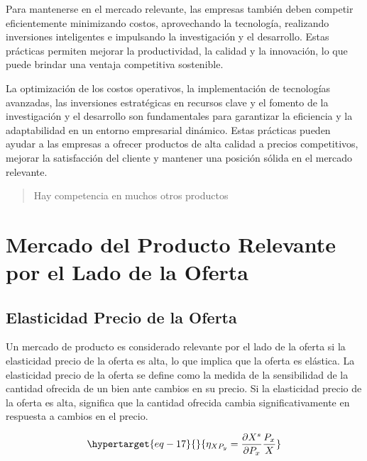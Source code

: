 \documentclass[
  a4paper,
]{article}
\theoremstyle{definition}
\theoremstyle{remark}
\begin{document}
Para mantenerse en el mercado relevante, las empresas también deben
competir eficientemente minimizando costos, aprovechando la tecnología,
realizando inversiones inteligentes e impulsando la investigación y el
desarrollo. Estas prácticas permiten mejorar la productividad, la
calidad y la innovación, lo que puede brindar una ventaja competitiva
sostenible.

La optimización de los costos operativos, la implementación de
tecnologías avanzadas, las inversiones estratégicas en recursos clave y
el fomento de la investigación y el desarrollo son fundamentales para
garantizar la eficiencia y la adaptabilidad en un entorno empresarial
dinámico. Estas prácticas pueden ayudar a las empresas a ofrecer
productos de alta calidad a precios competitivos, mejorar la
satisfacción del cliente y mantener una posición sólida en el mercado
relevante.

\begin{quote}
Hay competencia en muchos otros productos
\end{quote}

\hypertarget{mercado-del-producto-relevante-por-el-lado-de-la-oferta}{%
\section{Mercado del Producto Relevante por el Lado de la
Oferta}\label{mercado-del-producto-relevante-por-el-lado-de-la-oferta}}

\hypertarget{elasticidad-precio-de-la-oferta}{%
\subsection{Elasticidad Precio de la
Oferta}\label{elasticidad-precio-de-la-oferta}}

Un mercado de producto es considerado relevante por el lado de la oferta
si la elasticidad precio de la oferta es alta, lo que implica que la
oferta es elástica. La elasticidad precio de la oferta se define como la
medida de la sensibilidad de la cantidad ofrecida de un bien ante
cambios en su precio. Si la elasticidad precio de la oferta es alta,
significa que la cantidad ofrecida cambia significativamente en
respuesta a cambios en el precio.

\begin{equation}\protect\hypertarget{eq-17}{}{
\eta_{XP_{y}} = \frac{\partial X^s}{\partial P_{x}} \frac{P_{x}}{X}
}\label{eq-17}\end{equation}
\end{document}
